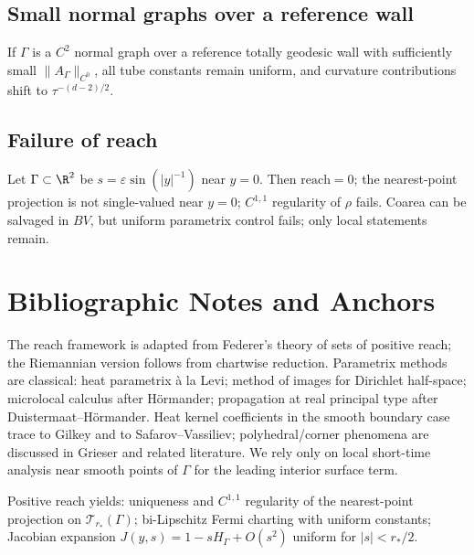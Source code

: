 \subsection{Small normal graphs over a reference wall}
If $\Gamma$ is a $C^2$ normal graph over a reference totally geodesic wall with sufficiently small $\|A_\Gamma\|_{C^0}$, all tube constants remain uniform, and curvature contributions shift to $\tau^{-(d-2)/2}$.

\subsection{Failure of reach}
Let $\Gamma\subset\R^2$ be $s=\varepsilon \sin(|y|^{-1})$ near $y=0$. Then $\mathrm{reach}=0$; the nearest-point projection is not single-valued near $y=0$; $C^{1,1}$ regularity of $\rho$ fails. Coarea can be salvaged in $BV$, but uniform parametrix control fails; only local statements remain.

\section*{Bibliographic Notes and Anchors}
The reach framework is adapted from Federer’s theory of sets of positive reach; the Riemannian version follows from chartwise reduction. 
Parametrix methods are classical: heat parametrix à la Levi; method of images for Dirichlet half-space; microlocal calculus after H\"ormander; propagation at real principal type after Duistermaat–H\"ormander. 
Heat kernel coefficients in the smooth boundary case trace to Gilkey and to Safarov–Vassiliev; polyhedral/corner phenomena are discussed in Grieser and related literature. 
We rely only on local short-time analysis near smooth points of $\Gamma$ for the leading interior surface term.

\begin{remark}
Positive reach yields: uniqueness and $C^{1,1}$ regularity of the nearest-point projection on $\mathcal T_{r_*}(\Gamma)$; bi-Lipschitz Fermi charting with uniform constants; Jacobian expansion $J(y,s)=1-sH_\Gamma+O(s^2)$ uniform for $|s|<r_*/2$.
\end{remark}

